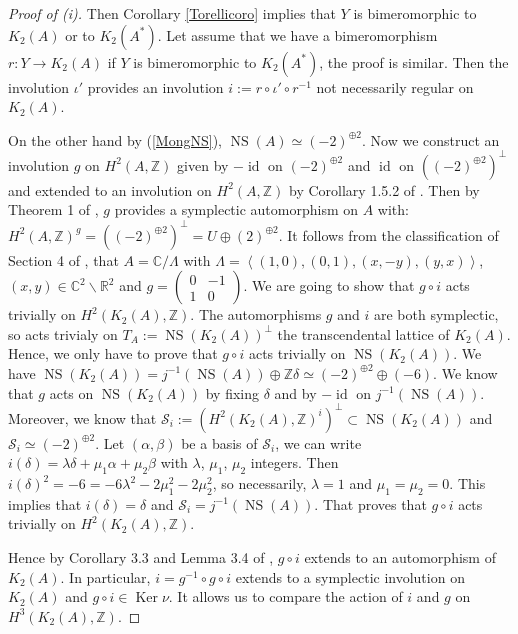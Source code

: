 \documentclass{alggeom}
\DeclareMathOperator{\id}{id}
\DeclareMathOperator{\Ker}{Ker}
\DeclareMathOperator{\NS}{NS}
\newcommand{\C}{\mathbb{C}}
\newcommand{\R}{\mathbb{R}}
\newcommand{\Z}{\mathbb{Z}}
\theoremstyle{plain}
\theoremstyle{definition}
\theoremstyle{remark}
\begin{document}
\begin{proof}[Proof of (i)]
Then Corollary \ref{Torellicoro} implies that $Y$ is bimeromorphic to $K_2(A)$ or to $K_2(A^*)$.
Let assume that we have a bimeromorphism $r:Y\rightarrow K_2(A)$ if $Y$ is bimeromorphic to $K_2(A^*)$, the proof is similar. 
Then the involution $\iota'$ provides an involution $i:=r\circ\iota'\circ r^{-1}$ not necessarily regular on $K_2(A)$.

On the other hand by (\ref{MongNS}), $\NS(A)\simeq (-2)^{\oplus2}$.
Now we construct an involution $g$ on $H^{2}(A,\Z)$ given by $-\id$ on $(-2)^{\oplus2}$ and $\id$ on $((-2)^{\oplus2})^{\bot}$ and extended to an involution on $H^{2}(A,\Z)$ by Corollary 1.5.2 of \cite{Lattice}. Then by Theorem 1 of \cite{Shioda}, $g$ provides a symplectic automorphism on $A$ with: $H^{2}(A,\Z)^{g}=((-2)^{\oplus2})^\bot=U\oplus (2)^{\oplus2}$.
It follows from the classification of Section 4 of \cite{MongWanTari0}, that $A=\C/\Lambda$ with $\Lambda=\left\langle (1,0),(0,1),(x,-y),(y,x)\right\rangle$, $(x,y)\in \C^2\smallsetminus \R^2$ and $g=\left(
\begin{array}{cc}
0 & -1\\
1 & 0 
\end{array} \right)$. 
We are going to show that $g\circ i$ acts trivially on $H^2(K_2(A),\Z)$. The automorphisms $g$ and $i$ are both symplectic, so acts trivialy on $T_A:=\NS(K_2(A))^\bot$ the transcendental lattice of $K_2(A)$. Hence, we only have to prove that $g\circ i$ acts trivially on $\NS(K_2(A))$. 
We have $\NS(K_2(A))=j^{-1}(\NS(A))\oplus\Z\delta\simeq (-2)^{\oplus2}\oplus(-6)$. We know that $g$ acts on $\NS(K_2(A))$ by fixing $\delta$ and by $-\id$ on $j^{-1}(\NS(A))$. Moreover, we know that $\mathcal{S}_i:=(H^2(K_2(A),\Z)^i)^\bot\subset \NS(K_2(A))$ and $\mathcal{S}_i\simeq (-2)^{\oplus2}$. Let $(\alpha,\beta)$ be a basis of $\mathcal{S}_i$, we can write $i(\delta)=\lambda\delta+\mu_1\alpha+\mu_2\beta$ with $\lambda$, $\mu_1$, $\mu_2$ integers. Then $i(\delta)^2=-6=-6\lambda^2-2\mu_1^2-2\mu_2^2$, so necessarily, $\lambda=1$ and $\mu_1=\mu_2=0$.
This implies that $i(\delta)=\delta$ and $\mathcal{S}_i=j^{-1}(\NS(A))$. That proves that $g\circ i$ acts trivially on $H^2(K_2(A),\Z)$.

Hence by Corollary 3.3 and Lemma 3.4 of \cite{FujikiK}, $g\circ i$ extends to an automorphism of $K_2(A)$. In particular, $i=g^{-1}\circ g\circ i$ extends to a symplectic involution on $K_2(A)$ and $g\circ i\in \Ker \nu$. It allows us to compare the action of $i$ and $g$ on $H^{3}(K_2(A),\Z)$.


\end{proof}
\end{document}
